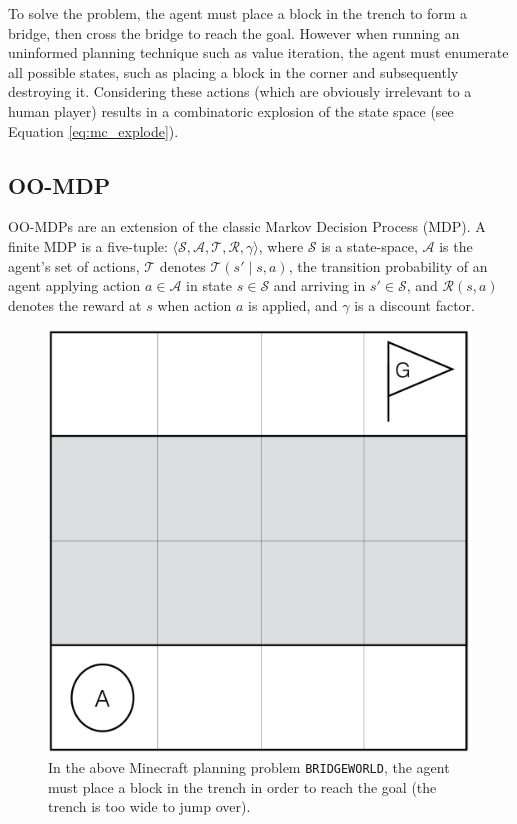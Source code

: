 \documentclass[]{article}
\begin{document}
To solve the problem, the agent must
place a block in the trench to form a bridge, then cross the bridge
to reach the goal.  However when running an uninformed planning
technique such as value iteration, the agent must enumerate all
possible states, such as placing a block in the corner and
subsequently destroying it.  Considering these actions (which are
obviously irrelevant to a human player) results in a combinatoric
explosion of the state space (see Equation \ref{eq:mc_explode}).

\subsection{OO-MDP}

OO-MDPs are an extension of the classic Markov Decision Process (MDP).
A finite MDP is a five-tuple: $\langle \mathcal{S}, \mathcal{A},
\mathcal{T}, \mathcal{R}, \gamma \rangle$, where $\mathcal{S}$ is a
state-space, $\mathcal{A}$ is the agent's set of actions,
$\mathcal{T}$ denotes $\mathcal{T}(s' \mid s,a)$, the transition
probability of an agent applying action $a \in \mathcal{A}$ in state
$s \in \mathcal{S}$ and arriving in $s' \in \mathcal{S}$, and
$\mathcal{R}(s,a)$ denotes the reward at $s$ when action $a$ is
applied, and $\gamma$ is a discount factor.

\begin{figure}
\centering
\includegraphics[scale=0.2]{figures/bridgeworld.png}
\caption{In the above Minecraft planning problem \texttt{BRIDGEWORLD},
the agent must place a block in the trench in order to reach the goal 
(the trench is too wide to jump over). \label{fig:bridgeworld}}
\end{figure}
\end{document}
